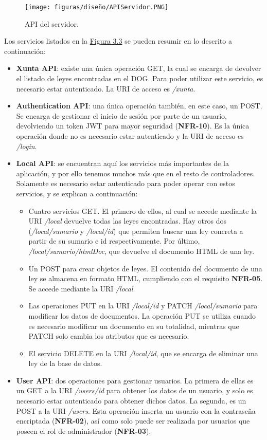 \begin{figure}[H]
\centerline{\texttt{[image: figuras/diseño/APIServidor.PNG]}}
\caption{API del servidor.}
\label{enlaceAPIServidor}
\end{figure}

Los servicios listados en la \hyperref[enlaceAPIServidor]{Figura 3.3} se pueden resumir en lo descrito a continuación:

\begin{itemize}
    \item {\bf Xunta API}: existe una única operación GET, la cual se encarga de devolver el listado de leyes encontradas en el DOG. Para poder utilizar este servicio, es necesario estar autenticado. La URI de acceso es {\it /xunta}.
    \item {\bf Authentication API}: una única operación también, en este caso, un POST. Se encarga de gestionar el inicio de sesión por parte de un usuario, devolviendo un token JWT \cite{jwt} para mayor seguridad ({\bf NFR-10}). Es la única operación donde no es necesario estar autenticado y la URI de acceso es {\it /login}.
    \item {\bf Local API}: se encuentran aquí los servicios más importantes de la aplicación, y por ello tenemos muchos más que en el resto de controladores. Solamente es necesario estar autenticado para poder operar con estos servicios, y se explican a continuación:
        \begin{itemize}
            \item Cuatro servicios GET. El primero de ellos, al cual se accede mediante la URI {\it /local} devuelve todas las leyes encontradas. Hay otros dos ({\it /local/sumario} y {\it /local/{id}}) que permiten buscar una ley concreta a partir de su sumario e id respectivamente. Por último, {\it /local/{sumario}/htmlDoc}, que devuelve el documento HTML de una ley.
            \item Un POST para crear objetos de leyes. El contenido del documento de una ley se almacena en formato HTML, cumpliendo con el requisito {\bf NFR-05}. Se accede mediante la URI {\it /local}.
            \item Las operaciones PUT en la URI {\it /local/{id}} y PATCH {\it /local/{sumario}} para modificar los datos de documentos. La operación PUT se utiliza cuando es necesario modificar un documento en su totalidad, mientras que PATCH solo cambia los atributos que es necesario.
            \item El servicio DELETE en la URI {\it /local/{id}}, que se encarga de eliminar una ley de la base de datos.
        \end{itemize}
    \item {\bf User API}: dos operaciones para gestionar usuarios. La primera de ellas es un GET a la URI {\it /users/{id}} para obtener los datos de un usuario, y solo es necesario estar autenticado para obtener dichos datos. La segunda, es un POST a la URI {\it /users}. Esta operación inserta un usuario con la contraseña encriptada ({\bf NFR-02}), así como solo puede ser realizada por usuarios que poseen el rol de administrador ({\bf NFR-03}).
\end{itemize}